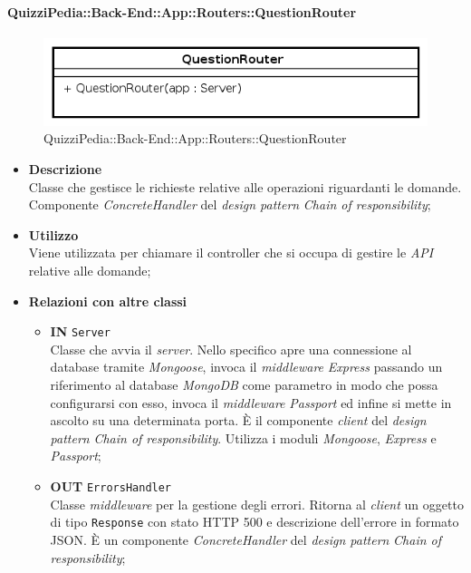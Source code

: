 \paragraph{QuizziPedia::Back-End::App::Routers::QuestionRouter}
\begin{figure}[ht]
	\centering
	\includegraphics[scale=0.45]{UML/Package/QuizziPedia_Back-End_App_Routers_questionRouter.png}
	\caption{QuizziPedia::Back-End::App::Routers::QuestionRouter}
\end{figure}
\FloatBarrier
	\begin{itemize}
		\item \textbf{Descrizione} \\
		Classe che gestisce le richieste relative alle operazioni riguardanti le domande. Componente \textit{ConcreteHandler} del \textit{design pattern} \textit{Chain of responsibility};
		\item \textbf{Utilizzo} \\
		Viene utilizzata per chiamare il controller che si occupa di gestire le \textit{API} relative alle domande;
		\item \textbf{Relazioni con altre classi} \\
		\begin{itemize}
			\item \textbf{IN} \texttt{Server}\\
			Classe che avvia il \textit{server}. Nello specifico apre una connessione al database tramite \textit{Mongoose}, invoca il \textit{middleware} \textit{Express} passando un riferimento al database \textit{MongoDB} come parametro in modo che possa configurarsi con esso, invoca il \textit{middleware} \textit{Passport} ed infine si mette in ascolto su una determinata porta. È il componente \textit{client} del \textit{design pattern} \textit{Chain of responsibility}. Utilizza i moduli \textit{Mongoose}, \textit{Express} e \textit{Passport};
			\item \textbf{OUT} \texttt{ErrorsHandler}\\
			Classe \textit{middleware} per la gestione degli errori. Ritorna al \textit{client} un oggetto di tipo \texttt{Response} con stato HTTP 500 e descrizione dell'errore in formato JSON. È un componente \textit{ConcreteHandler} del \textit{design pattern} \textit{Chain of responsibility};

\end{itemize}
\end{itemize}
